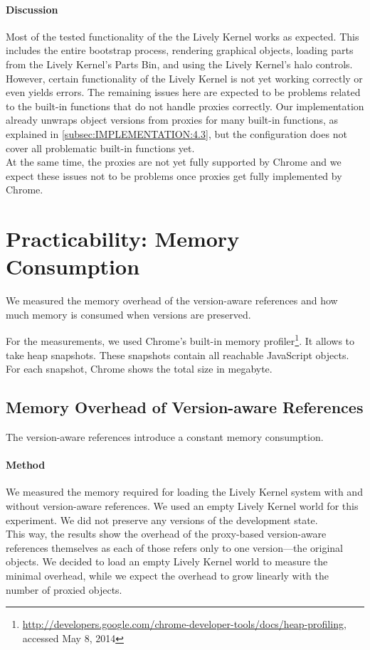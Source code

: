 \paragraph{Discussion}
Most of the tested functionality of the the Lively Kernel works as expected.
This includes the entire bootstrap process, rendering graphical objects, loading parts from the Lively Kernel's Parts Bin, and using the Lively Kernel's halo controls.
However, certain functionality of the Lively Kernel is not yet working correctly or even yields errors.
The remaining issues here are expected to be problems related to the built-in functions that do not handle proxies correctly.
Our implementation already unwraps object versions from proxies for many built-in functions, as explained in \ref{subsec:IMPLEMENTATION:4.3}, but the configuration does not cover all problematic built-in functions yet.\\
At the same time, the proxies are not yet fully supported by Chrome and we expect these issues not to be problems once proxies get fully implemented by Chrome.\\



\section{Practicability: Memory Consumption} \label{sec:EVALUATION:3}

We measured the memory overhead of the version-aware references and how much memory is consumed when versions are preserved.

For the measurements, we used Chrome's built-in memory profiler\footnote{\url{http://developers.google.com/chrome-developer-tools/docs/heap-profiling}, accessed May 8, 2014}.
It allows to take heap snapshots.
These snapshots contain all reachable JavaScript objects.
For each snapshot, Chrome shows the total size in megabyte.

\subsection{Memory Overhead of Version-aware References}

The version-aware references introduce a constant memory consumption.

\paragraph{Method}
We measured the memory required for loading the Lively Kernel system with and without version-aware references.
We used an empty Lively Kernel world for this experiment.
We did not preserve any versions of the development state.\\
This way, the results show the overhead of the proxy-based version-aware references themselves as each of those refers only to one version---the original objects.
We decided to load an empty Lively Kernel world to measure the minimal overhead, while we expect the overhead to grow linearly with the number of proxied objects.

